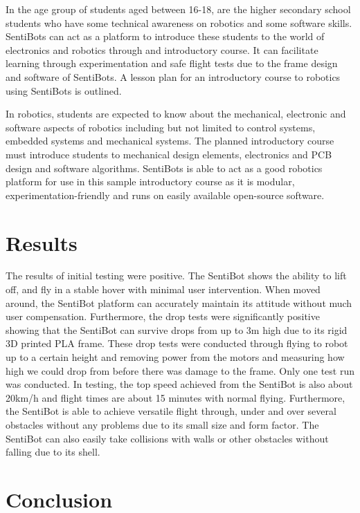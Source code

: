 \documentclass[12pt]{article}
\begin{document}
In the age group of students aged between 16-18, are the higher secondary school students who have some technical awareness on robotics and some software skills. SentiBots can act as a platform to introduce these students to the world of electronics and robotics through and introductory course. It can facilitate learning through experimentation and safe flight tests due to the frame design and software of SentiBots. A lesson plan for an introductory course to robotics using SentiBots is outlined.

In robotics, students are expected to know about the mechanical, electronic and software aspects of robotics including but not limited to control systems, embedded systems and mechanical systems. The planned introductory course must introduce students to mechanical design elements, electronics and PCB design and software algorithms. SentiBots is able to act as a good robotics platform for use in this sample introductory course as it is modular, experimentation-friendly and runs on easily available open-source software.

\section{Results}

The results of initial testing were positive. The SentiBot shows the ability to lift off, and fly in a stable hover with minimal user intervention. When moved around, the SentiBot platform can accurately maintain its attitude without much user compensation. Furthermore, the drop tests were significantly positive showing that the SentiBot can survive drops from up to 3m high due to its rigid 3D printed PLA frame. These drop tests were conducted through flying to robot up to a certain height and removing power from the motors and measuring how high we could drop from before there was damage to the frame. Only one test run was conducted. In testing, the top speed achieved from the SentiBot is also about 20km/h and flight times are about 15 minutes with normal flying. Furthermore, the SentiBot is able to achieve versatile flight through, under and over several obstacles without any problems due to its small size and form factor. The SentiBot can also easily take collisions with walls or other obstacles without falling due to its shell. 

\section{Conclusion}
\end{document}
